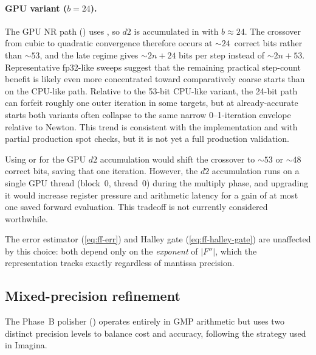 \paragraph{GPU variant ($b = 24$).}
The GPU NR path () uses ,
so $d2$ is accumulated in  with $b \approx 24$.
The crossover from cubic to quadratic convergence therefore occurs
at ${\sim}24$~correct bits rather than ${\sim}53$, and the late regime
gives ${\sim}2n + 24$ bits per step instead of ${\sim}2n + 53$.
Representative fp32-like sweeps suggest that the remaining practical
step-count benefit is likely even more concentrated toward comparatively coarse
starts than on the CPU-like path.  Relative to the 53-bit CPU-like variant,
the 24-bit path can forfeit roughly one outer iteration in some targets, but
at already-accurate starts both variants often collapse to the same narrow
0--1-iteration envelope relative to Newton.  This trend is consistent with the
implementation and with partial production spot checks, but it is not yet a
full production validation.

Using  or  for the GPU $d2$ accumulation
would shift the crossover to ${\sim}53$ or ${\sim}48$ correct bits,
saving that one iteration.
However, the $d2$ accumulation runs on a single GPU thread
(block~0, thread~0) during the multiply phase, and upgrading it would
increase register pressure and arithmetic latency for a gain of at most
one saved forward evaluation.  This tradeoff is not currently considered
worthwhile.

The error estimator (\cref{eq:ff-err}) and Halley gate
(\cref{eq:ff-halley-gate}) are unaffected by this choice: both depend
only on the \emph{exponent} of $|F''|$, which the 
representation tracks exactly regardless of mantissa precision.

\subsection{Mixed-precision refinement}
\label{subsec:ff-mixed-prec}

The Phase~B polisher () operates entirely in GMP
 arithmetic but uses two distinct precision levels to balance cost
and accuracy, following the strategy used in Imagina.

